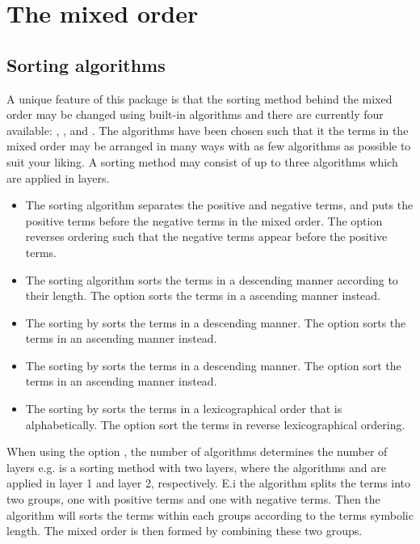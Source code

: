 	
	
	\clearpage
	\section{The mixed order} \label{ssec:overall_order}
	
	\subsection{Sorting algorithms} \label{ssec:sort-method}
	A unique feature of this package is that the sorting method behind the mixed order may be changed using built-in algorithms and there are currently four available: , ,  and . The algorithms have been chosen such that it the terms in the mixed order may be arranged in many ways with as few algorithms as possible to suit your liking. A sorting method may consist of up to three algorithms which are applied in layers.
	
	\begin{itemize}
		\item The sorting algorithm  separates the positive and negative terms, and puts the positive terms before the negative terms in the mixed order. The option  reverses ordering such that the negative terms appear before the positive terms.
		\item The sorting algorithm  sorts the terms in a descending manner according to their length. The option  sorts the terms in a ascending manner instead.
		\item The sorting by  sorts the terms in a descending manner. The option  sorts the terms in an ascending manner instead.
		\item The sorting by  sorts the terms in a descending manner. The option  sort the terms in an ascending manner instead.
		\item The sorting by  sorts the terms in a lexicographical order that is alphabetically. The option  sort the terms in reverse lexicographical ordering.
	\end{itemize}
	
	When using the option , the number of algorithms determines the number of layers e.g.  is a sorting method with two layers, where the algorithms  and  are applied in layer \num{1} and layer \num{2}, respectively. E.i the  algorithm splits the terms into two groups, one with positive terms and one with negative terms. Then the  algorithm will sorts the terms within each groups according to the terms symbolic length. The mixed order is then formed by combining these two groups.
	
